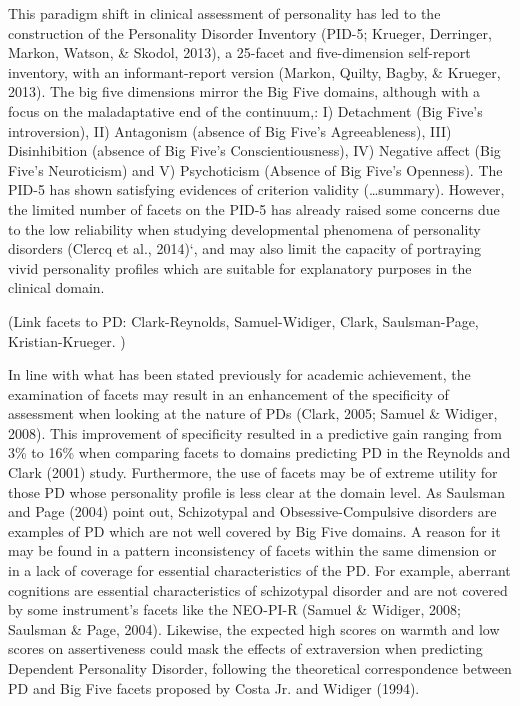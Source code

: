 \documentclass[,man]{apa6}
\theoremstyle{definition}
\theoremstyle{definition}
\theoremstyle{definition}
\theoremstyle{remark}
\begin{document}
This paradigm shift in clinical assessment of personality has led to the
construction of the Personality Disorder Inventory (PID-5; Krueger,
Derringer, Markon, Watson, \& Skodol, 2013), a 25-facet and
five-dimension self-report inventory, with an informant-report version
(Markon, Quilty, Bagby, \& Krueger, 2013). The big five dimensions
mirror the Big Five domains, although with a focus on the maladaptative
end of the continuum,: I) Detachment (Big Five's introversion), II)
Antagonism (absence of Big Five's Agreeableness), III) Disinhibition
(absence of Big Five's Conscientiousness), IV) Negative affect (Big
Five's Neuroticism) and V) Psychoticism (Absence of Big Five's
Openness). The PID-5 has shown satisfying evidences of criterion
validity (\ldots{}summary). However, the limited number of facets on the
PID-5 has already raised some concerns due to the low reliability when
studying developmental phenomena of personality disorders (Clercq et
al., 2014)`, and may also limit the capacity of portraying vivid
personality profiles which are suitable for explanatory purposes in the
clinical domain.

(Link facets to PD: Clark-Reynolds, Samuel-Widiger, Clark,
Saulsman-Page, Kristian-Krueger. )

In line with what has been stated previously for academic achievement,
the examination of facets may result in an enhancement of the
specificity of assessment when looking at the nature of PDs (Clark,
2005; Samuel \& Widiger, 2008). This improvement of specificity resulted
in a predictive gain ranging from 3\% to 16\% when comparing facets to
domains predicting PD in the Reynolds and Clark (2001) study.
Furthermore, the use of facets may be of extreme utility for those PD
whose personality profile is less clear at the domain level. As Saulsman
and Page (2004) point out, Schizotypal and Obsessive-Compulsive
disorders are examples of PD which are not well covered by Big Five
domains. A reason for it may be found in a pattern inconsistency of
facets within the same dimension or in a lack of coverage for essential
characteristics of the PD. For example, aberrant cognitions are
essential characteristics of schizotypal disorder and are not covered by
some instrument's facets like the NEO-PI-R (Samuel \& Widiger, 2008;
Saulsman \& Page, 2004). Likewise, the expected high scores on warmth
and low scores on assertiveness could mask the effects of extraversion
when predicting Dependent Personality Disorder, following the
theoretical correspondence between PD and Big Five facets proposed by
Costa Jr. and Widiger (1994).
\end{document}
